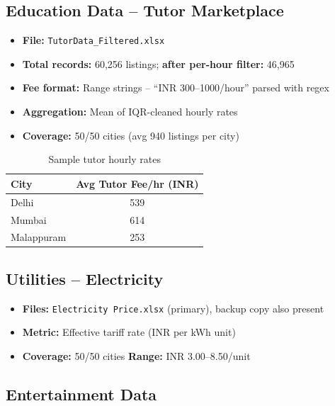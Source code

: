 \documentclass[12pt,a4paper]{article}
\begin{document}
\subsection{Education Data -- Tutor Marketplace}

\begin{itemize}[leftmargin=*]
  \item \textbf{File:} \texttt{TutorData\_Filtered.xlsx}
  \item \textbf{Total records:} 60,256 listings; \textbf{after per-hour filter:} 46,965
  \item \textbf{Fee format:} Range strings -- ``INR 300--1000/hour'' parsed with regex
  \item \textbf{Aggregation:} Mean of IQR-cleaned hourly rates
  \item \textbf{Coverage:} 50/50 cities (avg 940 listings per city)
\end{itemize}

\begin{table}[H]
  \centering
  \begin{tabular}{lc}
    \toprule
    \textbf{City} & \textbf{Avg Tutor Fee/hr (INR)} \\
    \midrule
    Delhi      & 539 \\
    Mumbai     & 614 \\
    Malappuram & 253 \\
    \bottomrule
  \end{tabular}
  \caption{Sample tutor hourly rates}
\end{table}

\subsection{Utilities -- Electricity}

\begin{itemize}[leftmargin=*]
  \item \textbf{Files:} \texttt{Electricity Price.xlsx} (primary), backup copy also present
  \item \textbf{Metric:} Effective tariff rate (INR per kWh unit)
  \item \textbf{Coverage:} 50/50 cities \quad \textbf{Range:} INR 3.00--8.50/unit
\end{itemize}

\subsection{Entertainment Data}
\end{document}

